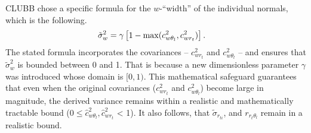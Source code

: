 \gls{CLUBB} chose a specific formula for the $w$-\enquote{width} of the individual normals,
which is the following.
\begin{align}
    \label{eq:sigma_tilde_w_restricted}
    {\tilde{\sigma}_w}^2
    &= \gamma \left[1 - \max(c_{w \theta_l}^2, c_{w r_t}^2) \right].
\end{align}
The stated formula incorporates the covariances
-- $c_{w r_t}^2$ and $c_{w \theta_l}^2$ --
and ensures that $\tilde{\sigma}_w^2$ is bounded between 0 and 1.
That is because a new dimensionless parameter $\gamma$ was introduced
whose domain is $[0, 1)$.
This mathematical safeguard guarantees
that even when the original covariances ($c_{w r_t}^2$ and $c_{w \theta_l}^2$)
become large in magnitude,
the derived variance remains within a realistic and mathematically tractable bound
($0 \leq \widehat{c}_{w \theta_l}^2, \widehat{c}_{w r_t}^2$ < 1).
It also follows, that $\tilde{\sigma}_{r_{ti}}$, and $r_{r_t \theta_l}$ remain in a realistic bound.